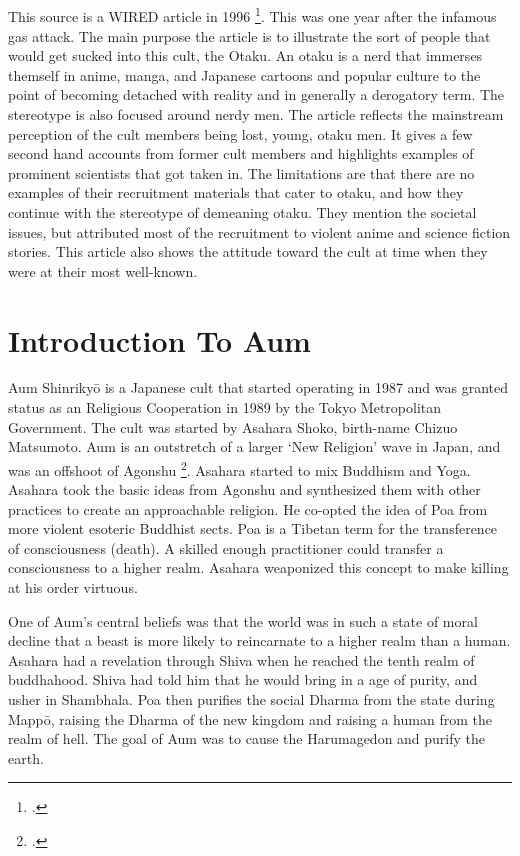 \documentclass[12pt, letterpaper]{article}
\newcommand{\sorta}[1]{`#1'}
\newcommand{\poses}[1]{#1's}
\begin{document}
\subsection{}

This source is a WIRED article in 1996 \footcite{noauthor_cult_nodate}. This was one year after the infamous gas attack. The main purpose 
the article is to illustrate the sort of people that would get sucked into this cult, the Otaku. An otaku
is a nerd that immerses themself in anime, manga, and Japanese cartoons and popular culture to the point of
becoming detached with reality and in generally a derogatory term. The stereotype is also focused around 
nerdy men. The article reflects the mainstream perception of the cult members being lost, young, 
otaku men. It gives a few second hand accounts from former cult members and highlights examples of 
prominent scientists that got taken in. The limitations are that there are no examples of their recruitment
materials that cater to otaku, and how they continue with the stereotype of demeaning otaku. They mention
the societal issues, but attributed most of the recruitment to violent anime and science fiction stories.
This article also shows the attitude toward the cult at time when they were at their most well-known. 

\section{Introduction To Aum}
Aum Shinriky\=o is a Japanese cult that started operating in 1987 and was granted status as an Religious
Cooperation in 1989 by the Tokyo Metropolitan Government. The cult was started by Asahara Shoko, birth-name
Chizuo Matsumoto. Aum is an outstretch of a larger \sorta{New Religion} wave in Japan, and was an offshoot of
Agonshu \footcite[82,83]{watanabe_religion_1998}. Asahara started to mix Buddhism and Yoga. Asahara took the
basic ideas from Agonshu and synthesized them with other practices to create an approachable religion.
He co-opted the idea of Poa from more violent esoteric Buddhist sects. Poa is a Tibetan term for the 
transference of consciousness (death). A skilled enough practitioner could transfer a consciousness to a 
higher realm. Asahara weaponized this concept to make killing at his order virtuous.

One of \poses{Aum} central beliefs was that the world was in such a state of moral decline that a beast is 
more likely to reincarnate to a higher realm than a human. Asahara had a revelation through Shiva when he 
reached the tenth realm of buddhahood. Shiva had told him that he would bring in a age of purity, and
usher in Shambhala. Poa then purifies the social Dharma from the state during Mapp\=o, raising the 
Dharma of the new kingdom and raising a human from the realm of hell. The goal of Aum was to cause the 
Harumagedon and purify the earth.
\end{document}
